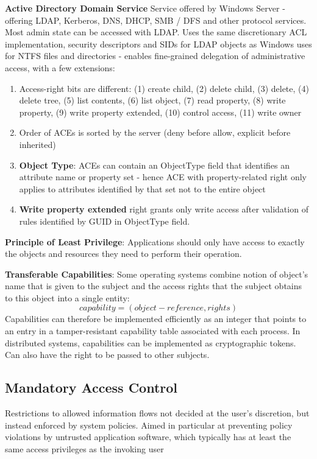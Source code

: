 \documentclass{article}
\begin{document}
\textbf{Active Directory Domain Service}
Service offered by Windows Server - offering LDAP, Kerberos, DNS, DHCP, SMB / DFS and other protocol services. Most admin state can be accessed with LDAP. Uses the same discretionary ACL implementation, security descriptors and SIDs for LDAP objects as Windows uses for NTFS files and directories - enables fine-grained delegation of administrative access, with a few extensions:
\begin{enumerate}
	\item Access-right bits are different: (1) create child, (2) delete child, (3) delete, (4) delete tree, (5) list contents, (6) list object, (7) read property, (8) write property, (9) write property extended, (10) control access, (11) write owner
	\item Order of ACEs is sorted by the server (deny before allow, explicit before inherited)
	\item \textbf{Object Type}: ACEs can contain an ObjectType field that identifies an attribute name or property set - hence ACE with property-related right only applies to attributes identified by that set not to the entire object
	\item \textbf{Write property extended} right grants only write access after validation of rules identified by GUID in ObjectType field. 
\end{enumerate}

\textbf{Principle of Least Privilege}: Applications should only have access to exactly the objects and resources they need to perform their operation. 

\bigskip
\noindent
\textbf{Transferable Capabilities}: Some operating systems combine notion of object's name that is given to the subject and the access rights that the subject obtains to this object into a single entity:
$$capability=(object-reference, rights)$$
Capabilities can therefore be implemented efficiently as an integer that points to an entry in a tamper-resistant capability table associated with each process. In distributed systems, capabilities can be implemented as cryptographic tokens. Can also have the right to be passed to other subjects.

\subsection{Mandatory Access Control}
Restrictions to allowed information flows not decided at the user's discretion, but instead enforced by system policies. Aimed in particular at preventing policy violations by untrusted application software, which typically has at least the same access privileges as the invoking user
\end{document}
